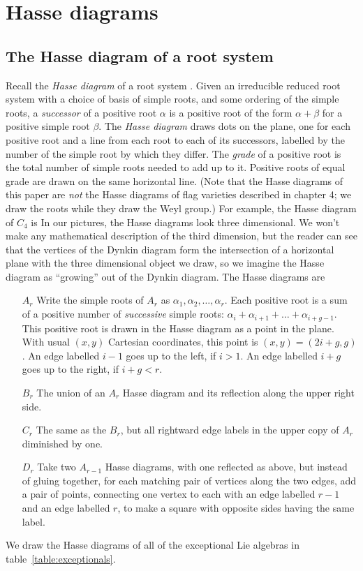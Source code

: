 \documentclass[a4paper,10pt]{amsart}
\theoremstyle{remark}
\begin{document}
\section{Hasse diagrams}
\subsection{The Hasse diagram of a root system}
Recall the \emph{Hasse diagram} of a root system \cite{Ringel2013}.
Given an irreducible reduced root system with a choice of basis of simple roots, and some ordering of the simple roots, a \emph{successor} of a positive root \(\alpha\) is a positive root of the form \(\alpha+\beta\) for a positive simple root \(\beta\).
The \emph{Hasse diagram} draws dots on the plane, one for each positive root and a line from each root to each of its successors, labelled by the number of the simple root by which they differ.
The \emph{grade} of a positive root is the total number of simple roots needed to add up to it.
Positive roots of equal grade are drawn on the same horizontal line.
(Note that the Hasse diagrams of this paper are \emph{not} the Hasse diagrams of flag varieties described in \cite{Baston/Eastwood:1989} chapter 4; we draw the roots while they draw the Weyl group.)
For example, the Hasse diagram of \(C_4\) is
\tikzset{/Lie Hasse diagram,attach Dynkin diagram=true,three D=true}
In our pictures, the Hasse diagrams look three dimensional.
We won't make any mathematical description of the third dimension, but the reader can see that the vertices of the Dynkin diagram form the intersection of a horizontal plane with the three dimensional object we draw, so we imagine the Hasse diagram as ``growing'' out of the Dynkin diagram.
The Hasse diagrams are
\begin{enumerate}
\item[\(A_r\)] Write the simple roots of \(A_r\) as \(\alpha_1,\alpha_2,\dots,\alpha_r\).
Each positive root is a sum of a positive number of \emph{successive} simple roots: \(\alpha_i+\alpha_{i+1}+\dots+\alpha_{i+g-1}\).
This positive root is drawn in the Hasse diagram as a point in the plane.
With usual \((x,y)\) Cartesian coordinates, this point is \((x,y)=(2i+g,g)\). 
An edge labelled \(i-1\) goes up to the left, if \(i>1\).
An edge labelled \(i+g\) goes up to the right, if \(i+g<r\).
\item[\(B_r\)] The union of an \(A_r\) Hasse diagram and its reflection along the upper right side.
\item[\(C_r\)] The same as the \(B_r\), but all rightward edge labels in the upper copy of \(A_r\) diminished by one.
\item[\(D_r\)] 
Take two \(A_{r-1}\) Hasse diagrams, with one reflected as above, but instead of gluing together, for each matching pair of vertices along the two edges, add a pair of points, connecting one vertex to each with an edge labelled \(r-1\) and an edge labelled \(r\), to make a square with opposite sides having the same label.
\end{enumerate}
We draw the Hasse diagrams of all of the exceptional Lie algebras in table~\vref{table:exceptionals}.
\end{document}
